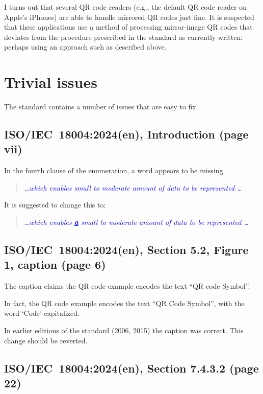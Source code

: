 \documentclass[a4paper,twoside]{article}
\newcommand{\shortstandard}{ISO/IEC~18004}
\newcommand{\standard}{\shortstandard:2024(en)}
\newcommand{\quotestandard}[1]{\textcolor{blue}{\textit{#1}}}
\newcommand{\ddd}{\dots}
\newcommand{\change}[1]{\underline{\textbf{#1}}}
\begin{document}
I turns out that several QR code readers (e.g., the default QR code reader on Apple's iPhones) are able to handle
mirrored QR codes just fine. It is suspected that these applications use a method of processing mirror-image QR
codes that deviates from the procedure prescribed in the standard as currently written; perhaps using an approach
such as described above.

\clearpage
\section{Trivial issues}
\label{sec:trivial-issues}

The standard contains a number of issues that are easy to fix.

\subsection{\standard, Introduction (page vii)}

In the fourth clause of the enumeration, a word appears to be missing.

\begin{quote}
\quotestandard{\ddd which enables small to moderate amount of data to be represented \ddd}
\end{quote}

It is suggested to change this to:

\begin{quote}
\quotestandard{\ddd which enables \change{a} small to moderate amount of data to be represented \ddd}
\end{quote}

\subsection{\standard, Section 5.2, Figure 1, caption (page 6)}

The caption claims the QR code example encodes the text ``QR code Symbol''.

In fact, the QR code example encodes the text ``QR Code Symbol'', with the word `Code' capitalized.

In earlier editions of the standard (2006, 2015) the caption was correct. This change should be reverted.

\subsection{\standard, Section 7.4.3.2 (page 22)}
\end{document}
